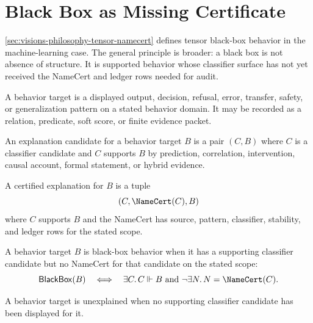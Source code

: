 \section{Black Box as Missing Certificate}
\label{sec:visions-philosophy-black-box-missing-certificate}

\autoref{sec:visions-philosophy-tensor-namecert} defines tensor
black-box behavior in the machine-learning case. The general principle is
broader: a black box is not absence of structure. It is supported
behavior whose classifier surface has not yet received the NameCert and
ledger rows needed for audit.

\begin{definition}
\label{def:philosophy-behavior-target}
A behavior target is a displayed output, decision, refusal, error,
transfer, safety, or generalization pattern on a stated behavior domain.
It may be recorded as a relation, predicate, soft score, or finite
evidence packet.
\end{definition}

\begin{definition}
\label{def:philosophy-explanation-candidate}
An explanation candidate for a behavior target $B$ is a pair $(C,B)$
where $C$ is a classifier candidate and $C$ supports $B$ by prediction,
correlation, intervention, causal account, formal statement, or hybrid
evidence.
\end{definition}

\begin{definition}
\label{def:philosophy-certified-explanation}
A certified explanation for $B$ is a tuple
$$
(C,\NameCert(C),B)
$$
where $C$ supports $B$ and the NameCert has source, pattern, classifier,
stability, and ledger rows for the stated scope.
\end{definition}

\begin{definition}
\label{def:philosophy-black-box-behavior}
A behavior target $B$ is black-box behavior when it has a supporting
classifier candidate but no NameCert for that candidate on the stated
scope:
$$
\mathsf{BlackBox}(B)
\quad\Longleftrightarrow\quad
\exists C.\, C\Vdash B\ \text{and}\ \neg\exists N.\,N=\NameCert(C).
$$
\end{definition}

\begin{definition}
\label{def:philosophy-unexplained-behavior}
A behavior target is unexplained when no supporting classifier candidate
has been displayed for it.
\end{definition}

